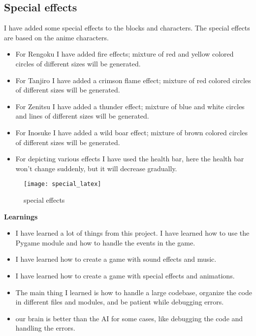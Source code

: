 \documentclass[12pt]{article}
\begin{document}
\subsection{Special effects}
I have added some special effects to the blocks and characters. The special effects are based on the anime characters.
\begin{itemize}
    \item For Rengoku I have added fire effects; mixture of red and yellow colored circles of different sizes will be generated.
    \item For Tanjiro I have added a crimson flame effect; mixture of red colored circles of different sizes will be generated.
    \item For Zenitsu I have added a thunder effect; mixture of blue and white circles and lines of different sizes will be generated.
    \item For Inosuke I have added a wild boar effect; mixture of brown colored circles of different sizes will be generated.
    \item For depicting various effects I have used the health bar, here the health bar won't change suddenly, but it will decrease gradually.
\end{itemize}
\begin{figure}[H]
    \centering
    \texttt{[image: special\_latex]}
    \caption{special effects}
    \label{fig:special_effects}
\end{figure}
\textbf{Learnings}
\begin{itemize}
    \item I have learned a lot of things from this project. I have learned how to use the Pygame module and how to handle the events in the game.
    \item I have learned how to create a game with sound effects and music.
    \item I have learned how to create a game with special effects and animations.
    \item The main thing I learned is how to handle a large codebase, organize the code in different files and modules, and be patient while debugging errors.
    \item our brain is better than the AI for some cases, like debugging the code and handling the errors.
\end{itemize}   
\end{document}

